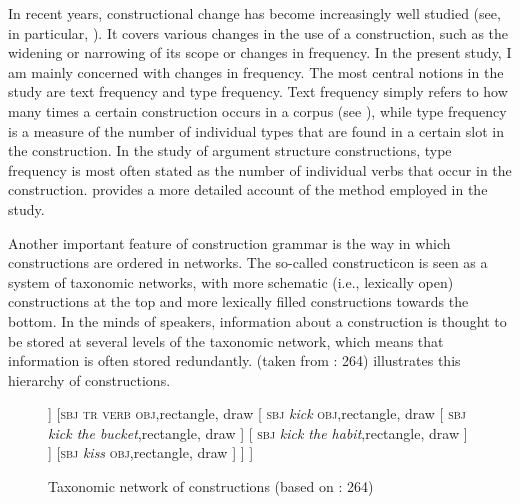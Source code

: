 \documentclass[output=paper]{langscibook}
\begin{document}
In recent years, constructional change has become increasingly well studied (see, in particular, \citealt{TraugottTrousdale2013}). It covers various changes in the use of a construction, such as the widening or narrowing of its scope or changes in frequency. In the present study, I am mainly concerned with changes in frequency. The most central notions in the study are text frequency and type frequency. Text frequency simply refers to how many times a certain construction occurs in a corpus (see \citealt{Hilpert2013}), while type frequency is a measure of the number of individual types that are found in a certain slot in the construction. In the study of argument structure constructions, type frequency is most often stated as the number of individual verbs that occur in the construction.  provides a more detailed account of the method employed in the study.



Another important feature of construction grammar is the way in which constructions are ordered in networks. The so-called constructicon is seen as a system of taxonomic networks, with more schematic (i.e., lexically open) constructions at the top and more lexically filled constructions towards the bottom. In the minds of speakers, information about a construction is thought to be stored at several levels of the taxonomic network, which means that information is often stored redundantly.  (taken from \citealt{CroftCruse2004}: 264) illustrates this hierarchy of constructions.


  


\begin{figure}
\caption{Taxonomic network of constructions (based on \citealt{CroftCruse2004}: 264)}
\label{fig:valdeson:1}

\begin{forest}
[\textsc{clause},rectangle,draw
	[\textsc{sbj} \textsc{intr} \textsc{verb}, rectangle, draw
		[\textsc{sbj} \textit{sleep},rectangle,draw
		]
		[\textsc{sbj} \textit{run},rectangle, draw
		]
	]
	[\textsc{sbj} \textsc{tr} \textsc{verb} \textsc{obj},rectangle, draw
		[
		\textsc{sbj} \textit{kick} \textsc{obj},rectangle, draw 
			[
			\textsc{sbj} \textit{kick the bucket},rectangle, draw
			]
			[
			\textsc{sbj} \textit{kick the habit},rectangle, draw
			]
		]
		[\textsc{sbj} \textit{kiss} \textsc{obj},rectangle, draw
		]
	]
]
\end{forest}
\end{figure}
\end{document}
